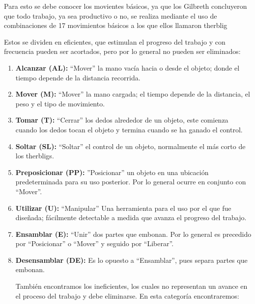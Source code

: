     
    Para esto se debe conocer los movientes básicos, ya que los Gilbreth concluyeron que todo trabajo, ya sea productivo o no, se realiza mediante el uso de combinaciones de 17 movimientos básicos a los que ellos llamaron therblig \cite{niebel1980ingenieria}  
    
    Estos se dividen en eficientes, que estimulan el progreso del trabajo y con frecuencia pueden ser acortados, pero por lo general no pueden ser eliminados:
    \begin{enumerate}
        \item \textbf{Alcanzar (AL):} “Mover” la mano vacía hacia o desde el objeto; donde el tiempo depende de la distancia recorrida.
        \item \textbf{Mover (M):} “Mover” la mano cargada; el tiempo depende de la distancia, el peso y el tipo de movimiento.
        \item \textbf{Tomar (T):} “Cerrar” los dedos alrededor de un objeto, este comienza cuando los dedos tocan el objeto y termina cuando se ha ganado el control.
        \item \textbf{Soltar (SL):} “Soltar” el control de un objeto, normalmente el más corto de los therbligs.
        \item \textbf{Preposicionar (PP):} ”Posicionar” un objeto en una ubicación predeterminada para su uso posterior. Por lo general ocurre en conjunto con “Mover”.
        \item \textbf{Utilizar (U):} “Manipular” Una herramienta para el uso por el que fue diseñada; fácilmente detectable a medida que avanza el progreso del trabajo.
        \item \textbf{Ensamblar (E):} “Unir” dos partes que embonan. Por lo general es precedido por “Posicionar” o “Mover” y seguido por “Liberar”.
        \item \textbf{Desensamblar (DE):} Es lo opuesto a “Ensamblar”, pues separa partes que embonan.
    
     También encontramos los ineficientes, los cuales no representan un avance en el proceso del trabajo y debe eliminarse. En esta categoría encontraremos:
    

\end{enumerate}
